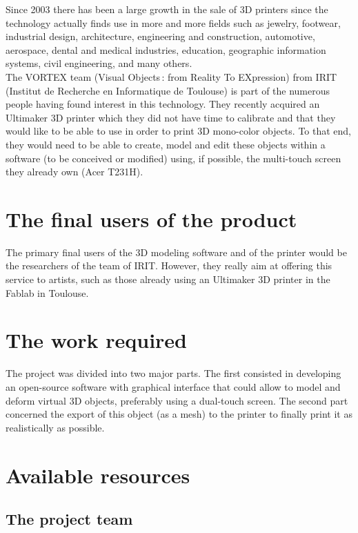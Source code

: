 \documentclass{report}
\begin{document}
	Since 2003 there has been a large growth in the sale of 3D printers since the technology actually finds use in more and more fields such as jewelry, footwear, industrial design, architecture, engineering and construction, automotive, aerospace, dental and medical industries, education, geographic information systems, civil engineering, and many others.\\

	The VORTEX team (Visual Objects : from Reality To EXpression) from IRIT (Institut de Recherche en Informatique de Toulouse) is part of the numerous people having found interest in this technology. They recently acquired an Ultimaker 3D printer which they did not have time to calibrate and that they would like to be able to use in order to print 3D mono-color objects. To that end, they would need to be able to create, model and edit these objects within a software (to be conceived or modified) using, if possible, the multi-touch screen they already own (Acer T231H).\\

\section{The final users of the product}

	The primary final users of the 3D modeling software and of the printer would be the researchers of the team of IRIT. However, they really aim at offering this service to artists, such as those already using an Ultimaker 3D printer in the Fablab in Toulouse.

\section{The work required}

	The project was divided into two major parts. The first consisted in developing an open-source software with graphical interface that could allow to model and deform virtual 3D objects, preferably using a dual-touch screen. The second part concerned the export of this object (as a mesh) to the printer to finally print it as realistically as possible.

\section{Available resources}

\subsection{The project team}
\end{document}
